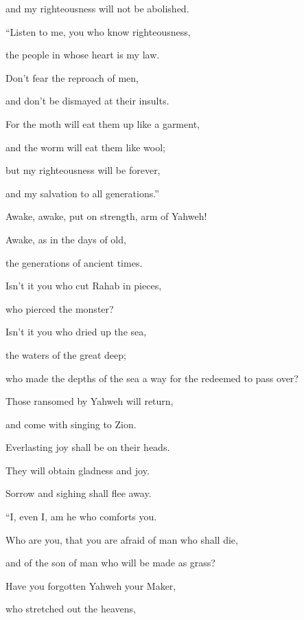 {\par }{\QB and my righteousness will not be abolished.
\par }{\BB \par }{\Q {}“Listen to me, you who know righteousness,
\par }{\QB the people in whose heart is my law.
\par }{\Q Don’t fear the reproach of men,
\par }{\QB and don’t be dismayed at their insults.
\par }{\Q {}For the moth will eat them up like a garment,
\par }{\QB and the worm will eat them like wool;
\par }{\Q but my righteousness will be forever,
\par }{\QB and my salvation to all generations.”
\par }{\BB \par }{\Q {}Awake, awake, put on strength, arm of Yahweh!
\par }{\QB Awake, as in the days of old,
\par }{\QB the generations of ancient times.
\par }{\Q Isn’t it you who cut Rahab in pieces,
\par }{\QB who pierced the monster?
\par }{\Q {}Isn’t it you who dried up the sea,
\par }{\QB the waters of the great deep;
\par }{\QB who made the depths of the sea a way for the redeemed to pass over?
\par }{\Q {}Those ransomed by Yahweh will return,
\par }{\QB and come with singing to Zion.
\par }{\QB Everlasting joy shall be on their heads.
\par }{\Q They will obtain gladness and joy.
\par }{\QB Sorrow and sighing shall flee away.
\par }{\BB \par }{\Q {}“I, even I, am he who comforts you.
\par }{\QB Who are you, that you are afraid of man who shall die,
\par }{\QB and of the son of man who will be made as grass?
\par }{\Q {}Have you forgotten Yahweh your Maker,
\par }{\QB who stretched out the heavens,
}
